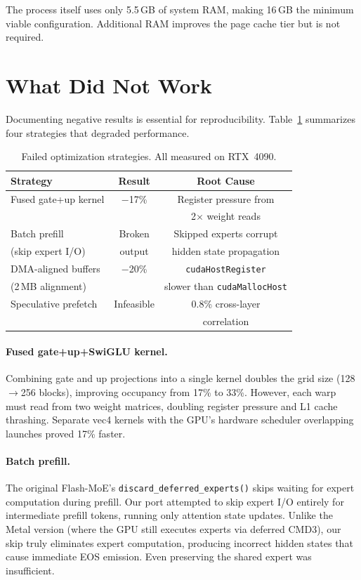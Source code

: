 \documentclass[10pt]{article}
\begin{document}
The process itself uses only 5.5\,GB of system RAM, making 16\,GB the minimum viable configuration. Additional RAM improves the page cache tier but is not required.

\section{What Did Not Work}

Documenting negative results is essential for reproducibility. Table~\ref{tab:negative} summarizes four strategies that degraded performance.

\begin{table}[h]
\centering
\small
\caption{Failed optimization strategies. All measured on RTX~4090.}
\label{tab:negative}
\begin{tabular}{lcc}
\toprule
\textbf{Strategy} & \textbf{Result} & \textbf{Root Cause} \\
\midrule
Fused gate+up kernel & $-$17\% & Register pressure from \\
& & 2$\times$ weight reads \\
Batch prefill & Broken & Skipped experts corrupt \\
(skip expert I/O) & output & hidden state propagation \\
DMA-aligned buffers & $-$20\% & \texttt{cudaHostRegister} \\
(2\,MB alignment) & & slower than \texttt{cudaMallocHost} \\
Speculative prefetch & Infeasible & 0.8\% cross-layer \\
& & correlation \\
\bottomrule
\end{tabular}
\end{table}

\paragraph{Fused gate+up+SwiGLU kernel.} Combining gate and up projections into a single kernel doubles the grid size (128$\to$256 blocks), improving occupancy from 17\% to 33\%. However, each warp must read from two weight matrices, doubling register pressure and L1 cache thrashing. Separate vec4 kernels with the GPU's hardware scheduler overlapping launches proved 17\% faster.

\paragraph{Batch prefill.} The original Flash-MoE's \texttt{discard\_deferred\_experts()} skips waiting for expert computation during prefill. Our port attempted to skip expert I/O entirely for intermediate prefill tokens, running only attention state updates. Unlike the Metal version (where the GPU still executes experts via deferred CMD3), our skip truly eliminates expert computation, producing incorrect hidden states that cause immediate EOS emission. Even preserving the shared expert was insufficient.
\end{document}
